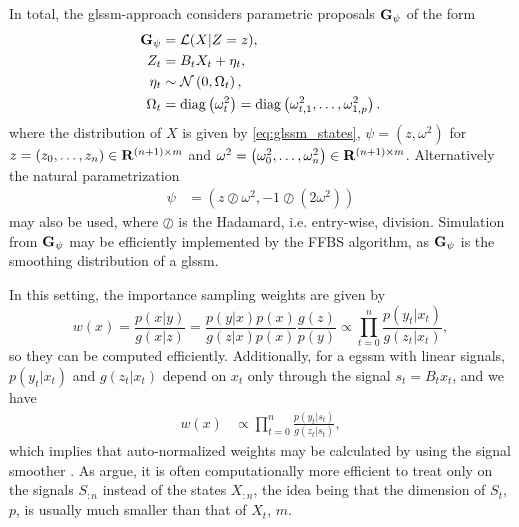 In total, the \gls{glssm}-approach considers parametric proposals $\mathbf G_{\psi}$ of the form
\begin{align}
    \begin{split}
    \label{eq:glssm-proposal}
    \mathbf G_{\psi} &= \mathcal L(X | Z = z),\\
    Z_{t} &= B_{t} X_{t} + \eta_{t},\\
    \eta_{t} &\sim \mathcal N \left( 0, \Omega_{t} \right),\\
    \Omega_{t} &= \operatorname{diag} \left( \omega^{2}_{t} \right) = \operatorname{diag} \left( \omega^{2}_{t,1}, \dots, \omega^{2}_{1,p} \right).
    \end{split}
\end{align}
where the distribution of $X$ is given by \eqref{eq:glssm_states}, $\psi = \left( z, \omega^{2} \right)$ for $z = \left( z_{0}, \dots, z_{n} \right) \in \mathbf R^{(n+1) \times m}$ and $\omega^{2} = \left( \omega^{2}_{0}, \dots, \omega^{2}_{n} \right) \in \mathbf R^{(n+1) \times m}$. Alternatively the natural parametrization 
\begin{align}
    \label{eq:eis_glssm_natural_parametrization}
    \psi &= \left( z \oslash \omega^{2}, - 1 \oslash \left( 2 \omega^{2} \right) \right)
\end{align}
may also be used, where $\oslash$ is the Hadamard, i.e. entry-wise, division. Simulation from $\mathbf G_{\psi}$ may be efficiently implemented by the FFBS algorithm, as $\mathbf G_{\psi}$ is the smoothing distribution of a \gls{glssm}. 

In this setting, the importance sampling weights are given by 
$$
w(x) = \frac{p(x|y)}{g(x|z)} = \frac{p(y|x)p(x)}{g(z|x)p(x)} \frac{g(z)}{p(y)} \propto \prod_{t = 0}^n \frac{p(y_{t}|x_{t})}{g(z_{t}|x_{t})},
$$
so they can be computed efficiently. Additionally, for a \acrshort{egssm} with linear signals, $p(y_{t}|x_{t})$ and $g(z_{t}|x_{t})$ depend on $x_{t}$ only through the signal $s_{t} = B_{t}x_{t}$, and we have 
\begin{align}
\label{eq:weights_only_on_signal}
w(x) &\propto \prod_{t = 0}^{n}\frac{p(y_{t}|s_{t})}{g(z_{t}|s_{t})},
\end{align}
which implies that auto-normalized weights may be calculated by using the signal smoother \citep[Theorem 2]{Jungbacker2007Monte}.
As \citep{Durbin2012Time} \citep[Section 4.5.3]{Durbin2012Time} argue, it is often computationally more efficient to treat only on the signals $S_{:n}$ instead of the states $X_{:n}$, the idea being that the dimension of $S_{t}$, $p$, is usually much smaller than that of $X_{t}$, $m$. 

